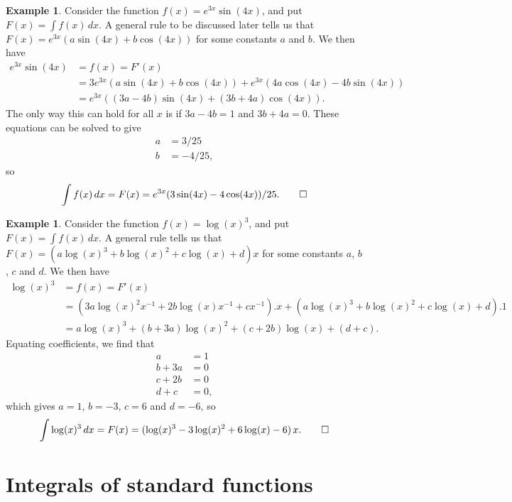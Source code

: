 \documentclass[a4paper]{book}
\renewcommand{\:}{\colon}
\theoremstyle{definition}
\newtheorem{example}[theorem]{Example}
\begin{document}
\begin{example}
 Consider the function $f(x)=e^{3x}\sin(4x)$, and put
 $F(x)=\int f(x)\,dx$.  A general rule to be discussed later tells us
 that $F(x)=e^{3x}(a\sin(4x)+b\cos(4x))$ for some constants $a$ and
 $b$.  We then have
 \begin{align*}
  e^{3x}\sin(4x) &= f(x) = F'(x) \\
   &= 3 e^{3x}(a\sin(4x)+b\cos(4x)) +
      e^{3x}(4a\cos(4x)-4b\sin(4x)) \\
   &= e^{3x}((3a-4b)\sin(4x) + (3b+4a)\cos(4x)).
 \end{align*}
 The only way this can hold for all $x$ is if $3a-4b=1$ and
 $3b+4a=0$.  These equations can be solved to give
 \begin{align*}
  a &= 3/25 \\
  b &= -4/25,
 \end{align*}
 so 
 \[ \int f(x)\, dx = F(x) = 
     e^{3x}(3\sin(4x) - 4\cos(4x))/25. \qed
 \]
\end{example}
\begin{example}
 Consider the function $f(x)=\log(x)^3$, and put $F(x)=\int f(x)\,dx$.
 A general rule tells us that
 $F(x)=(a\log(x)^3+b\log(x)^2+c\log(x)+d)x$ for some constants $a$,
 $b$, $c$ and $d$.  We then have 
 \begin{align*}
  \log(x)^3 &= f(x) = F'(x) \\
   &= (3a\log(x)^2x^{-1} + 2b\log(x) x^{-1} + c x^{-1}).x +
      (a\log(x)^3+b\log(x)^2+c\log(x)+d).1 \\
   &= a\log(x)^3 + (b+3a)\log(x)^2 + (c+2b)\log(x) + (d+c).
 \end{align*}
 Equating coefficients, we find that
 \begin{align*}
  a &= 1 \\
  b+3a &= 0 \\
  c+2b &= 0 \\
  d+c  &= 0, 
 \end{align*}
 which gives $a=1$, $b=-3$, $c=6$ and $d=-6$, so 
 \[ \int \log(x)^3\,dx = F(x) =
     (\log(x)^3 - 3\log(x)^2 + 6\log(x) - 6)\,x. \qed
 \] 
\end{example}
\newpage

\section{Integrals of standard functions}
\label{sec-int-standard}
\end{document}
